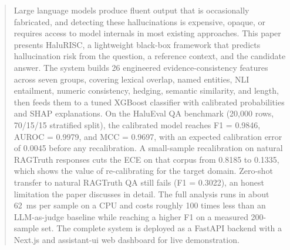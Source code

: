 \begin{abstract}
\noindent
Large language models produce fluent output that is occasionally fabricated, and detecting these hallucinations is expensive, opaque, or requires access to model internals in most existing approaches. This paper presents HaluRISC, a lightweight black-box framework that predicts hallucination risk from the question, a reference context, and the candidate answer. The system builds 26 engineered evidence-consistency features across seven groups, covering lexical overlap, named entities, NLI entailment, numeric consistency, hedging, semantic similarity, and length, then feeds them to a tuned XGBoost classifier with calibrated probabilities and SHAP explanations. On the HaluEval QA benchmark (20{,}000 rows, 70/15/15 stratified split), the calibrated model reaches F1 = 0.9846, AUROC = 0.9979, and MCC = 0.9697, with an expected calibration error of 0.0045 before any recalibration. A small-sample recalibration on natural RAGTruth responses cuts the ECE on that corpus from 0.8185 to 0.1335, which shows the value of re-calibrating for the target domain. Zero-shot transfer to natural RAGTruth QA still fails (F1 = 0.3022), an honest limitation the paper discusses in detail. The full analysis runs in about 62~ms per sample on a CPU and costs roughly 100 times less than an LLM-as-judge baseline while reaching a higher F1 on a measured 200-sample set. The complete system is deployed as a FastAPI backend with a Next.js and assistant-ui web dashboard for live demonstration.
\end{abstract}
